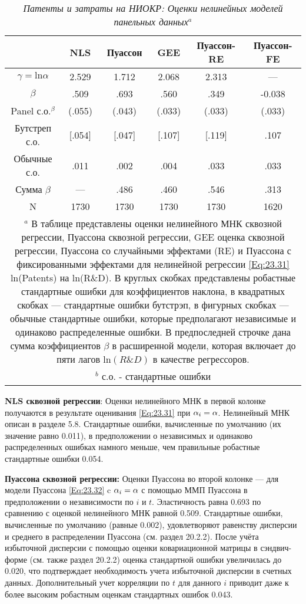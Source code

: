 \begin{table}[ht]
\caption{{\it Патенты и затраты на НИОКР: Оценки нелинейных моделей панельных данных}$^a$} 
\centering
\begin{tabular}{c|c|c|c|c|c}
\hline \hline
  & \textbf{NLS} & \textbf{Пуассон} & \textbf{GEE} & \textbf{Пуассон-RE} & \textbf{Пуассон-FE} \\ 
\hline 
$\gamma=\mathrm{ln}\alpha$ & 2.529 & 1.712 & 2.068 & 2.313 & --- \\ 
$\beta$ & .509 & .693 & .560 & .349 & -0.038 \\  
Panel с.о.$^\beta$ & (.055) & (.043) & (.033) & (.033) & (.033) \\ 
Бутстреп с.о. & [.054] & [.047] & [.107] & [.119] & {.107} \\ 
Обычные с.о. & {.011} & {.002} & {.004} & {.033} & {.033} \\ 
Сумма $\beta$ & --- & .486 & .460 & .546 & .313 \\ 
N & 1730 & 1730 & 1730 & 1730 & 1620 \\ 
\hline \hline
\multicolumn{6}{p{15cm}}{${}^a$ В таблице представлены оценки нелинейного МНК сквозной регрессии, Пуассона сквозной регрессии, GEE оценка сквозной регрессии, Пуассона со случайными эффектами (RE) и Пуассона с фиксированными эффектами для нелинейной регрессии \ref{Eq:23.31} ln(Patents) на ln(R\&D). В круглых скобках представлены робастные стандартные ошибки для коэффициентов наклона, в квадратных скобках --- стандартные ошибки бутстрэп, в фигурных скобках --- обычные стандартные ошибки, которые предполагают независимые и одинаково распределенные ошибки. В предпоследней строчке дана сумма коэффициентов $\beta$ в расширенной модели, которая включает до пяти лагов $\mathrm{ln}(R \& D)$ в качестве регрессоров.} \\
\multicolumn{6}{p{15cm}}{$^b$ с.о. - стандартные ошибки}
\end{tabular} 
\label{Tab:23.1}
\end{table}

\textbf{NLS сквозной регрессии}: Оценки нелинейного МНК в первой колонке получаются в результате оценивания \ref{Eq:23.31} при $\alpha_i=\alpha$. Нелинейный МНК описан в  разделе 5.8. Стандартные ошибки, вычисленные по умолчанию (их значение равно 0.011), в предположении о независимых и одинаково распределенных ошибках намного меньше, чем правильные робастные стандартные ошибки 0.054.

\textbf{Пуассона сквозной регрессии:} Оценки Пуассона во второй колонке --- для модели Пуассона \ref{Eq:23.32} c $\alpha_i=\alpha$ с помощью ММП Пуассона в предположении о независимости по $i$ и $t$. Эластичность равна 0.693 по сравнению с оценкой нелинейного МНК равной 0.509. Стандартные ошибки, вычисленные по умолчанию (равные 0.002), удовлетворяют равенству дисперсии и среднего в распределении Пуассона (см. раздел 20.2.2). После учёта избыточной дисперсии с помощью оценки ковариационной матрицы в сэндвич-форме  (см. также раздел 20.2.2) оценка стандартной ошибки увеличилась до 0.020, что подтверждает необходимость учета избыточной дисперсии в счетных данных. Дополнительный учет корреляции по $t$ для данного $i$ приводит даже к более высоким робастным оценкам стандартных ошибок 0.043.

